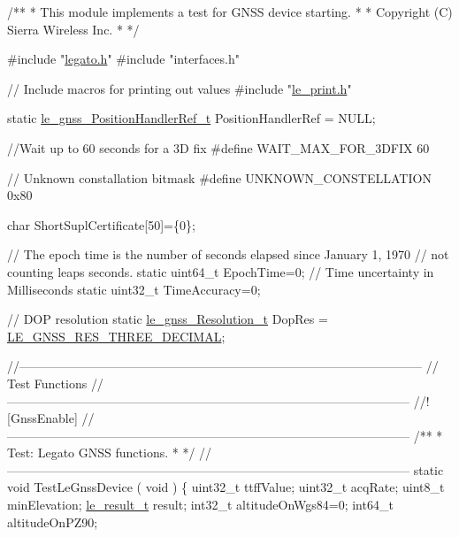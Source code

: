 
\begin{DoxyCodeInclude}
\textcolor{comment}{ /**}
\textcolor{comment}{  * This module implements a test for GNSS device starting.}
\textcolor{comment}{  *}
\textcolor{comment}{  * Copyright (C) Sierra Wireless Inc.}
\textcolor{comment}{  *}
\textcolor{comment}{  */}

\textcolor{preprocessor}{#include "\hyperlink{legato_8h}{legato.h}"}
\textcolor{preprocessor}{#include "interfaces.h"}

\textcolor{comment}{// Include macros for printing out values}
\textcolor{preprocessor}{#include "\hyperlink{le__print_8h}{le\_print.h}"}

\textcolor{keyword}{static} \hyperlink{le__gnss__interface_8h_a55a27b330b348c8d78073fe0e3e784eb}{le\_gnss\_PositionHandlerRef\_t} PositionHandlerRef = NULL;

\textcolor{comment}{//Wait up to 60 seconds for a 3D fix}
\textcolor{preprocessor}{#define WAIT\_MAX\_FOR\_3DFIX  60}

\textcolor{comment}{// Unknown constallation bitmask}
\textcolor{preprocessor}{#define UNKNOWN\_CONSTELLATION  0x80}

\textcolor{keywordtype}{char} ShortSuplCertificate[50]=\{0\};

\textcolor{comment}{// The epoch time is the number of seconds elapsed since January 1, 1970}
\textcolor{comment}{// not counting leaps seconds.}
\textcolor{keyword}{static} uint64\_t EpochTime=0;
\textcolor{comment}{// Time uncertainty in Milliseconds}
\textcolor{keyword}{static} uint32\_t TimeAccuracy=0;

\textcolor{comment}{// DOP resolution}
\textcolor{keyword}{static} \hyperlink{le__gnss__interface_8h_aaf5d256c75737a2189c8da7bfed5da0d}{le\_gnss\_Resolution\_t} DopRes = 
      \hyperlink{le__gnss__interface_8h_aaf5d256c75737a2189c8da7bfed5da0da4c6bce2bb0595f9683e7333ce637cb5c}{LE\_GNSS\_RES\_THREE\_DECIMAL};

\textcolor{comment}{//--------------------------------------------------------------------------------------------------}
\textcolor{comment}{//                                       Test Functions}
\textcolor{comment}{//--------------------------------------------------------------------------------------------------}
\textcolor{comment}{}
\textcolor{comment}{//! [GnssEnable]}
\textcolor{comment}{}\textcolor{comment}{//--------------------------------------------------------------------------------------------------}\textcolor{comment}{}
\textcolor{comment}{/**}
\textcolor{comment}{ * Test: Legato GNSS functions.}
\textcolor{comment}{ *}
\textcolor{comment}{ */}
\textcolor{comment}{//--------------------------------------------------------------------------------------------------}
\textcolor{keyword}{static} \textcolor{keywordtype}{void} TestLeGnssDevice
(
    \textcolor{keywordtype}{void}
)
\{
    uint32\_t ttffValue;
    uint32\_t acqRate;
    uint8\_t  minElevation;
    \hyperlink{le__basics_8h_a1cca095ed6ebab24b57a636382a6c86c}{le\_result\_t} result;
    int32\_t altitudeOnWgs84=0;
    int64\_t altitudeOnPZ90;


\end{DoxyCodeInclude}
